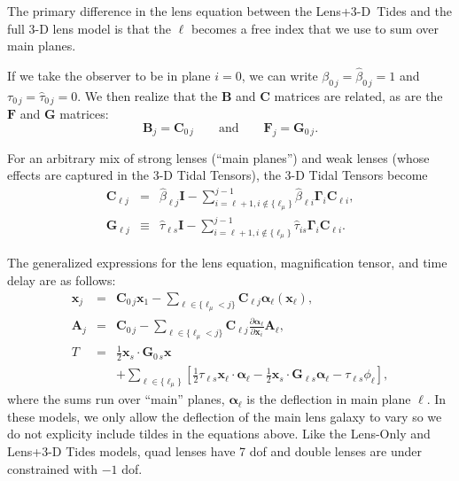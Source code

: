\documentclass{emulateapj}
\newcommand\A[0]{\mathbf{A}}
\newcommand\B[0]{\mathbf{B}}
\newcommand\C[0]{\mathbf{C}}
\newcommand\I[0]{\mathbf{I}}
\newcommand\F[0]{\mathbf{F}}
\newcommand\G[0]{\mathbf{G}}
\newcommand\GammaMat[0]{\boldsymbol{\Gamma}}
\newcommand\x[0]{\mathbf{x}}
\newcommand\al[0]{\boldsymbol{\alpha}}
\newcommand\betahat{\hat{\beta}}
\newcommand\tauhat{\hat{\tau}}
\begin{document}
 The primary difference in the lens equation between the Lens+3-D~Tides and the full 3-D lens model is that the $\ell$ becomes a free index that we use to sum over main planes. 
 
 If we take the observer to be in plane $i = 0$, we can write $\beta_{0\,j} = \betahat_{0 \, j} =  1$ and $\tau_{0\,j} = \tauhat_{0\,j} = 0$. We then realize that the $\B$ and $\C$ matrices are related, as are the $\F$ and $\G$ matrices:
\begin{equation}\label{eqn:BC-FG}
\B_j = \C_{0 \, j}
\qquad\mbox{and}\qquad
\F_{j} = \G_{0 \, j}.
\end{equation}

For an arbitrary mix of strong lenses (``main planes'') and weak lenses (whose effects are captured in the 3-D Tidal Tensors), the 3-D Tidal Tensors become
\begin{eqnarray}
\C_{\ell j} &=& \betahat_{\ell j} \I - \sum\limits_{i=\ell+1, i\not\in\{\ell_\mu\}}^{j-1} \betahat_{\ell i}\GammaMat_i\C_{\ell i},\\
\G_{\ell j}&\equiv& 
 \tauhat_{\ell s}\I- \sum\limits_{i=\ell+1,i\not\in\{\ell_\mu\}}^{j-1} \tauhat_{is}\GammaMat_i\C_{\ell i}.
\end{eqnarray}

 The generalized expressions for the lens equation, magnification tensor, and time delay are as follows:
\begin{eqnarray}
\x_{j} &=& \C_{0\, j} \x_1 - \sum_{\ell \in \{\ell_\mu<j\}} \C_{\ell j} \al_\ell(\x_\ell),\label{eqn:lenseqn}\\
\A_{j} &=& \C_{0 \, j} - \sum_{\ell \in \{\ell_\mu<j\}} \C_{\ell j} \frac{\partial \al_\ell}{\partial \x_i} \A_\ell,\\
T &=& \frac{1}{2} \x_s \cdot \G_{0 \,s} \x \nonumber \\
&&+ \sum\limits_{\ell \in \{\ell_\mu\}}\left[\frac{1}{2}\tau_{\ell s} \x_\ell \cdot \al_\ell -\frac{1}{2}\x_s \cdot \G_{\ell s}\al_\ell -\tau_{\ell s}\phi_\ell \right],
\end{eqnarray}
where the sums run over ``main'' planes, $\al_\ell$ is the deflection in main plane $\ell$. In these models, we only allow the deflection of the main lens galaxy to vary so we do not explicity include tildes in the equations above. Like the Lens-Only and Lens+3-D Tides models, quad lenses have 7 dof and double lenses are under constrained with $-1$ dof. 
\end{document}
